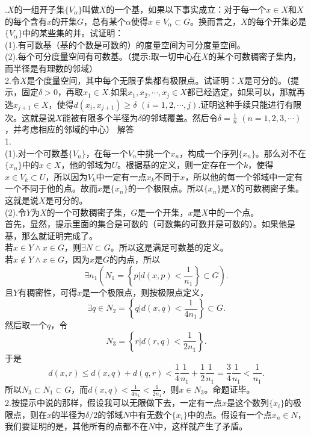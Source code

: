 \documentclass[11pt,a4paper,openany]{article} \usepackage{amssymb,amsfonts, amsmath,ctex,bm}
\begin{document}
.$X$的一组开子集$\{V_\alpha\}$叫做$X$的一个基，如果以下事实成立：对于每一个$x\in X$和$X$的每个含有$x$的开集$G$，总有某个$\alpha$使得$x\in V_\alpha \subset G$。换而言之，$X$的每个开集必是$\{V_\alpha\}$中的某些集的并。试证明：\\
(1).有可数基（基的个数是可数的）的度量空间为可分度量空间。\\
(2).每个可分度量空间有可数基。（提示:取一切中心在$X$的某个可数稠密子集内，而半径是有理数的邻域）\\
2.令$X$是个度量空间，其中每个无限子集都有极限点。试证明：$X$是可分的。（提示，固定$\delta>0$，再取$x_1 \in X$.如果$x_1,x_2,\cdots,x_j\in X$都已经选定，如果可以，那就再选$x_{j+1}\in X$，使得$d(x_i,x_{j+1})\geq \delta$ $(i=1,2,\cdots,j)$.证明这种手续只能进行有限次。这就是说$X$能被有限多个半径为$\delta$的邻域覆盖。然后令$\displaystyle{\delta=\frac{1}{n}}$ $(n=1,2,3,\cdots)$，并考虑相应的邻域的中心）
\newpage
\noindent 解答\\1.\\
(1).对一个可数基$\{V_n\}$，在每一个$V_n$中挑一个$x_n$，构成一个序列$\{x_n\}$。那么对不在$\{x_n\}$中的$x\in X$，他的邻域为$U$。根据基的定义，则一定存在一个$k$，使得$x\in V_k \subset U$，所以因为$V_k$中一定有一点$x_k$不同于$x$，所以他的每一个邻域中一定有一个不同于他的点。故而$x$是$\{x_n\}$的一个极限点。所以$\{x_n\}$是$X$的可数稠密子集。这就是说$X$是可分的。\\
(2).令$Y$为$X$的一个可数稠密子集，$G$是一个开集，$x$是$X$中的一个点。\\
\indent 首先，显然，提示里面的集合是可数的（可数集的可数并是可数的）。如果他是基，那么就证明完成了。\\
\indent 若$x\in Y \wedge x\in G $，则$\exists N \subset G$。所以这是满足可数基的定义。\\
\indent 若$x\notin Y \wedge x\in G $，因为$x$是$G$的内点，所以
\[
\exists n_1\left( N_1=\left\lbrace p\bigg|d(x,p)<\frac{1}{n_1} \right\rbrace  \subset G \right ).\]
且$Y$有稠密性，可得$x$是一个极限点，则按极限点定义，
\[
\exists q\in N_2=\left\lbrace q\bigg|d(x,q)<\frac{1}{4n_1} \right\rbrace  \subset G 
.\]
然后取一个$q$，令
\[
N_3=\left\lbrace r\bigg|d(r,q)<\frac{1}{2n_1} \right\rbrace.
\]
于是
\[
d(x,r)\le d(x,q)+d(q,r)<\frac{1}{4}\frac{1}{n_1}+\frac{1}{2}\frac{1}{n_1}=\frac{3}{4}\frac{1}{n_1}<\frac{1}{n_1}.
\]
所以$N_3\subset N_1 \subset G$，而$d(x,q)<\frac{1}{4n_1}<\frac{1}{2n_1}$，则$x\in N_3$。命题证毕。\\
2.按提示中说的那样，假设我可以无限做下去，一定有一点$x$是这个数列$\{x_i\}$的极限点，则在$x$的半径为$\delta/2$的邻域$N$中有无数个$\{x_i\}$中的点。假设有一个点$x_n\in N$，我们要证明的是，其他所有的点都不在$N$中，这样就产生了矛盾。\\
\end{document}
